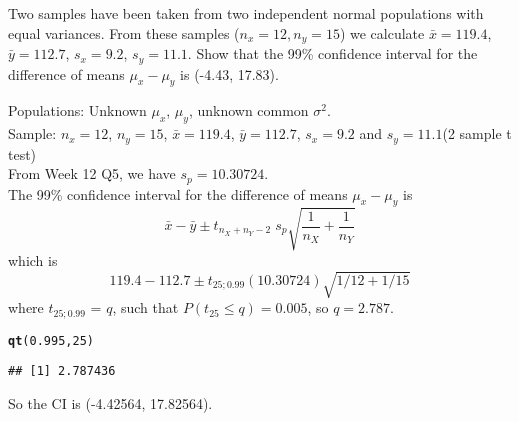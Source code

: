 \documentclass[bigtut]{tutorial}\usepackage[]{graphicx}\usepackage[]{color}
\makeatletter
\newcommand{\hlnum}[1]{\textcolor[rgb]{0.686,0.059,0.569}{#1}}%
\newcommand{\hlstd}[1]{\textcolor[rgb]{0.345,0.345,0.345}{#1}}%
\newcommand{\hlkwd}[1]{\textcolor[rgb]{0.737,0.353,0.396}{\textbf{#1}}}%
\newenvironment{kframe}{%
 \def\at@end@of@kframe{}%
 \ifinner\ifhmode%
  \def\at@end@of@kframe{\end{minipage}}%
  \begin{minipage}{\columnwidth}%
 \fi\fi%
 \def\FrameCommand##1{\hskip\@totalleftmargin \hskip-\fboxsep
 \colorbox{shadecolor}{##1}\hskip-\fboxsep
     \hskip-\linewidth \hskip-\@totalleftmargin \hskip\columnwidth}%
 \MakeFramed {\advance\hsize-\width
   \@totalleftmargin\z@ \linewidth\hsize
   \@setminipage}}%
 {\par\unskip\endMakeFramed%
 \at@end@of@kframe}
\newenvironment{knitrout}{}{} %
\makeatother
\begin{document}
\begin{tutorial}
\begin{questions}
Two samples have been taken from two independent normal populations with equal variances. From these
samples ($n_x = 12, n_y = 15$) we calculate $\bar x=119.4$, $\bar
y=112.7$, $s_x=9.2$, $s_y=11.1$.  Show that the  99\% %
confidence interval for the difference of means $\mu_x-\mu_y$  is (-4.43, 17.83).


\begin{solution}
Populations: Unknown $\mu_{x}$, $\mu_{y}$, unknown common $\sigma^2$. \\
Sample: $n_x = 12$, $n_y = 15$, $\bar x=119.4$, $\bar y=112.7$, $s_x=9.2$ and $s_y=11.1$(2 sample t test) \\
From Week 12 Q5, we have $s_{p} = 10.30724$. \\

The  99\% confidence interval for the difference of means $\mu_x-\mu_y$  is
\[ \bar x - \bar y \pm t_{n_X+n_Y-2} \;   s_p \sqrt{ \frac{1}{n_X}   + \frac{1}{n_Y}  } \]
which is
\[ 119.4 -112.7 \pm t_{25;0.99} (10.30724) \sqrt{ 1/12 + 1/15}  \]
where $t_{25;0.99}$ = $q$, such that $P(t_{25} \leq q) = 0.005$, so $q=2.787$.

\begin{knitrout}
\color{fgcolor}\begin{kframe}
\begin{alltt}
\hlkwd{qt}\hlstd{(}\hlnum{0.995}\hlstd{,}\hlnum{25}\hlstd{)}
\end{alltt}
\begin{verbatim}
## [1] 2.787436
\end{verbatim}
\end{kframe}
\end{knitrout}

So the CI is (-4.42564, 17.82564).
\end{solution}










\end{questions}

\end{tutorial}
\end{document}
